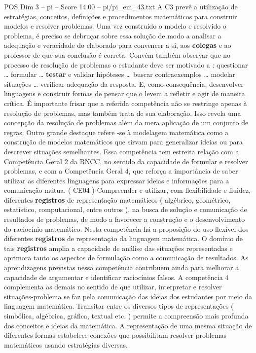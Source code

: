 \begin{textsample}{POS Dim 3 – pi – Score 14.00 – pi/pi\_em\_43.txt}
A C3 prevê a utilização de estratégias, conceitos, definições e procedimentos matemáticos para construir modelos e resolver problemas.
Uma vez construído o modelo e resolvido o problema, é preciso se debruçar sobre essa solução de modo a analisar a adequação e veracidade do elaborado para convencer a si, aos \textbf{colegas} e ao professor de que sua conclusão é correta.
Convém também observar que no processo de resolução de problemas o estudante deve ser motivado a : questionar … formular … \textbf{testar} e validar hipóteses … buscar contraexemplos … modelar situações … verificar adequação da resposta.
E, como consequência, desenvolver linguagens e construir formas de pensar que o levem a refletir e agir de maneira crítica.
É importante frisar que a referida competência não se restringe apenas à resolução de problemas, mas também trata de sua elaboração.
Isso revela uma concepção da resolução de problemas além da mera aplicação de um conjunto de regras.
Outro grande destaque refere -se à modelagem matemática como a construção de modelos matemáticos que sirvam para generalizar ideias ou para descrever situações semelhantes.
Essa competência tem estreita relação com a Competência Geral 2 da BNCC, no sentido da capacidade de formular e resolver problemas, e com a Competência Geral 4, que reforça a importância de saber utilizar as diferentes linguagens para expressar ideias e informações para a comunicação mútua. ( CE04 ) Compreender e utilizar, com flexibilidade e fluidez, diferentes \textbf{registros} de representação matemáticos ( algébrico, geométrico, estatístico, computacional, entre outros ), na busca de solução e comunicação de resultados de problemas, de modo a favorecer a construção e o desenvolvimento do raciocínio matemático.
Nesta competência há a proposição do uso flexível dos diferentes \textbf{registros} de representação da linguagem matemática.
O domínio de tais \textbf{registros} amplia a capacidade de análise das situações representadas e aprimora tanto os aspectos de formulação como a comunicação de resultados.
As aprendizagens previstas nessa competência contribuem ainda para melhorar a capacidade de argumentar e identificar raciocínios falsos.
A competência 4 complementa as demais no sentido de que utilizar, interpretar e resolver situações-problema se faz pela comunicação das ideias dos estudantes por meio da linguagem matemática.
Transitar entre os diversos tipos de representações ( simbólica, algébrica, gráfica, textual etc. ) permite a compreensão mais profunda dos conceitos e ideias da matemática.
A representação de uma mesma situação de diferentes formas estabelece conexões que possibilitam resolver problemas matemáticos usando estratégias diversas.

\end{textsample}
